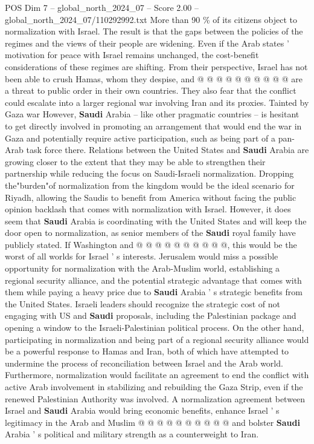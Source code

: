 \begin{textsample}{POS Dim 7 – global\_north\_2024\_07 – Score 2.00 – global\_north\_2024\_07/110292992.txt}
More than 90 \% of its citizens object to normalization with Israel.
The result is that the gaps between the policies of the regimes and the views of their people are widening.
Even if the Arab states ' motivation for peace with Israel remains unchanged, the cost-benefit considerations of these regimes are shifting.
From their perspective, Israel has not been able to crush Hamas, whom they despise, and @ @ @ @ @ @ @ @ @ @ are a threat to public order in their own countries.
They also fear that the conflict could escalate into a larger regional war involving Iran and its proxies.
Tainted by Gaza war However, \textbf{Saudi} Arabia -- like other pragmatic countries -- is hesitant to get directly involved in promoting an arrangement that would end the war in Gaza and potentially require active participation, such as being part of a pan-Arab task force there.
Relations between the United States and \textbf{Saudi} Arabia are growing closer to the extent that they may be able to strengthen their partnership while reducing the focus on Saudi-Israeli normalization.
Dropping the"burden"of normalization from the kingdom would be the ideal scenario for Riyadh, allowing the Saudis to benefit from America without facing the public opinion backlash that comes with normalization with Israel.
However, it does seem that \textbf{Saudi} Arabia is coordinating with the United States and will keep the door open to normalization, as senior members of the \textbf{Saudi} royal family have publicly stated.
If Washington and @ @ @ @ @ @ @ @ @ @, this would be the worst of all worlds for Israel ' s interests.
Jerusalem would miss a possible opportunity for normalization with the Arab-Muslim world, establishing a regional security alliance, and the potential strategic advantage that comes with them while paying a heavy price due to \textbf{Saudi} Arabia ' s strategic benefits from the United States.
Israeli leaders should recognize the strategic cost of not engaging with US and \textbf{Saudi} proposals, including the Palestinian package and opening a window to the Israeli-Palestinian political process.
On the other hand, participating in normalization and being part of a regional security alliance would be a powerful response to Hamas and Iran, both of which have attempted to undermine the process of reconciliation between Israel and the Arab world.
Furthermore, normalization would facilitate an agreement to end the conflict with active Arab involvement in stabilizing and rebuilding the Gaza Strip, even if the renewed Palestinian Authority was involved.
A normalization agreement between Israel and \textbf{Saudi} Arabia would bring economic benefits, enhance Israel ' s legitimacy in the Arab and Muslim @ @ @ @ @ @ @ @ @ @ and bolster \textbf{Saudi} Arabia ' s political and military strength as a counterweight to Iran.

\end{textsample}
